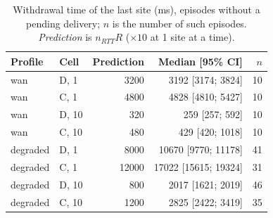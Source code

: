 \documentclass[journal]{IEEEtran}
\theoremstyle{definition}
\begin{document}
\begin{table}[t]
\centering
\caption{Withdrawal time of the last site (ms), episodes without a pending delivery; $n$ is the number of such episodes. \emph{Prediction} is $n_{RTT}R$ ($\times10$ at 1 site at a time).}
\label{tab:netem}
\scriptsize
\begin{tabular}{@{}llrrr@{}}
\toprule
Profile & Cell & Prediction & Median [95\% CI] & $n$ \\
\midrule
wan & D, 1 & 3200 & 3192 [3174; 3824] & 10 \\
wan & C, 1 & 4800 & 4828 [4810; 5427] & 10 \\
wan & D, 10 & 320 & 259 [257; 592] & 10 \\
wan & C, 10 & 480 & 429 [420; 1018] & 10 \\
degraded & D, 1 & 8000 & 10670 [9770; 11178] & 41 \\
degraded & C, 1 & 12000 & 17022 [15615; 19324] & 31 \\
degraded & D, 10 & 800 & 2017 [1621; 2019] & 46 \\
degraded & C, 10 & 1200 & 2825 [2422; 3419] & 35 \\
\bottomrule
\end{tabular}
\end{table}
\end{document}
